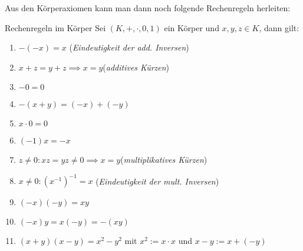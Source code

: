 Aus den Körperaxiomen kann man dann noch folgende Rechenregeln herleiten:
\begin{satz}{Rechenregeln im Körper}{} Sei $(K, +, \cdot,0, 1)$ ein Körper und $x,y,z \in K$, dann gilt:
\begin{enumerate}[label=\alph*)]
    \item $-(-x) = x$ \hfill (\textit{Eindeutigkeit der add. Inversen})
    \item $x+z = y+z \implies x = y$\hfill (\textit{additives Kürzen})
    \item $-0 = 0$
    \item $-(x+y) = (-x) + (-y)$
    \item $x\cdot 0 = 0$
    \item $(-1)x = -x$
    \item $z \neq 0: xz = yz  \neq 0 \implies x = y$\hfill (\textit{multiplikatives Kürzen})
    \item $x \neq 0: (x^{-1})^{-1} = x$ \hfill (\textit{Eindeutigkeit der mult. Inversen})
    \item $(-x)(-y) = xy$
    \item $(-x)y = x(-y) = -(xy)$
    \item $(x + y)(x - y) = x^2 - y^2$ mit $x^2 := x\cdot x$ und $x - y := x + (-y)$
\end{enumerate}
\end{satz}
